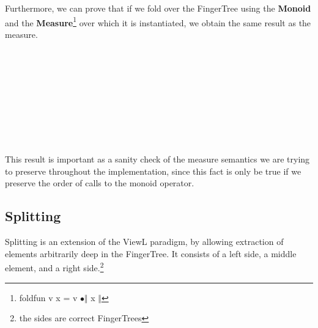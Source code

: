 \documentclass[12pt,twoside,notitlepage]{report}
\begin{document}
Furthermore, we can prove that if we fold over the FingerTree using the \textbf{Monoid} and the \textbf{Measure}\footnote{foldfun v x = v $∙ \Vert$ x $\Vert$} over which it is instantiated, we obtain the same result as the measure. 

\begin{code}
\\
\> \AgdaSymbol{:}  \AgdaSymbol{\{}\AgdaSymbol{\}} \AgdaSymbol{\{} \AgdaSymbol{:}  \AgdaSymbol{\}} \AgdaSymbol{\{} \AgdaSymbol{:}  \AgdaSymbol{\}}\<%
\\
\>[2]\<[14]%
\>[14]  \AgdaSymbol{:}   \<%
\\
\>[2]\<[14]%
\>[14]  \AgdaSymbol{:}    \<%
\\
\>[2]\<[14]%
\>[14] \AgdaSymbol{\{} \AgdaSymbol{:} \AgdaSymbol{\}}\<%
\\
\>[2]\<[14]%
\>[14] \AgdaSymbol{(} \AgdaSymbol{:} \AgdaSymbol{)}\<%
\\
\>[2]\<[14]%
\>[14] \AgdaSymbol{(} \AgdaSymbol{:}    \AgdaSymbol{\{}\AgdaSymbol{\})}\<%
\\
\>[2]\<[14]%
\>[14] \AgdaSymbol{(}       \AgdaSymbol{)}\<%
\\
\end{code}

This result is important as a sanity check of the measure semantics we are trying to preserve throughout the implementation, since this fact is only be true if we preserve the order of calls to the monoid operator.

\subsection{Splitting}

Splitting is an extension of the ViewL paradigm, by allowing extraction of elements arbitrarily deep in the FingerTree. It consists of a left side, a middle element, and a right side.\footnote{the sides are correct FingerTrees}
\end{document}
